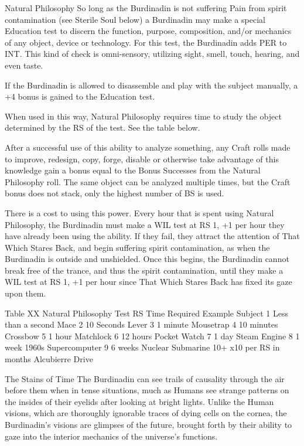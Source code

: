 \documentclass[oneside,11pt,english]{book}
\begin{document}
 

Natural Philosophy 
So long as the Burdinadin is not suffering Pain from spirit contamination (see Sterile Soul below) 
a Burdinadin may make a special Education test to discern the function, purpose, composition, 
and/or mechanics of any object, device or technology. For this test, the Burdinadin adds PER to 
INT. This kind of check is omni-sensory, utilizing sight, smell, touch, hearing, and even taste. 

 

If the Burdinadin is allowed to disassemble and play with the subject manually, a +4 bonus is 
gained to the Education test. 

 

When used in this way, Natural Philosophy requires time to study the object determined by the 
RS of the test. See the table below. 

 

After a successful use of this ability to analyze something, any Craft rolls made to improve, 
redesign, copy, forge, disable or otherwise take advantage of this knowledge gain a bonus equal 
to the Bonus Successes from the Natural Philosophy roll. The same object can be analyzed 
multiple times, but the Craft bonus does not stack, only the highest number of BS is used. 

 

There is a cost to using this power. Every hour that is spent using Natural Philosophy, the 
Burdinadin must make a WIL test at RS 1, +1 per hour they have already been using the ability. If 
they fail, they attract the attention of That Which Stares Back, and begin suffering spirit 
contamination, as when the Burdinadin is outside and unshielded. Once this begins, the 
Burdinadin cannot break free of the trance, and thus the spirit contamination, until they make a 
WIL test at RS 1, +1 per hour since That Which Stares Back has fixed its gaze upon them. 

 
Table XX Natural Philosophy 
Test RS Time Required Example Subject 
1 Less than a second Mace 
2 10 Seconds Lever 
3 1 minute Mousetrap 
4 10 minutes Crossbow 
5 1 hour Matchlock 
6 12 hours Pocket Watch 
7 1 day Steam Engine 
8 1 week 1960s Supercomputer 
9 6 weeks Nuclear Submarine 
10+ x10 per RS in months Alcubierre Drive 


 
The Stains of Time 
The Burdinadin can see trails of causality through the air before them when in tense situations, 
much as Humans see strange patterns on the insides of their eyelids after looking at bright lights. 
Unlike the Human visions, which are thoroughly ignorable traces of dying cells on the cornea, the 
Burdinadin's visions are glimpses of the future, brought forth by their ability to gaze into the 
interior mechanics of the universe's functions. 
\end{document}
